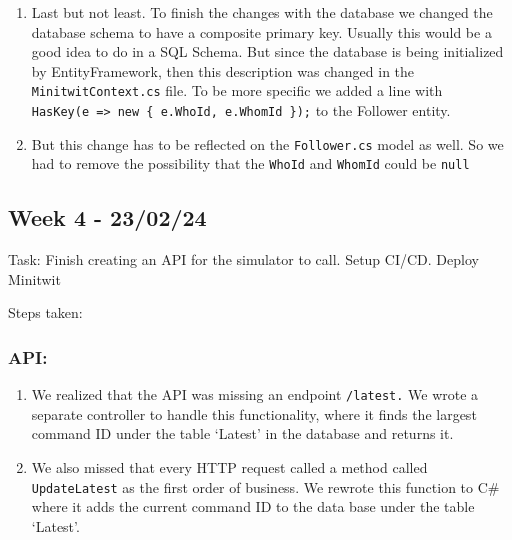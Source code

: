 \begin{enumerate}
    \item Last but not least. To finish the changes with the database we changed the database schema to have a composite primary key. Usually this would be a good idea to do in a SQL Schema. But since the database is being initialized by EntityFramework, then this description was changed in the \texttt{MinitwitContext.cs} file. To be more specific we added a line with \texttt{HasKey(e\ =\textgreater{}\ new\ \{\ e.WhoId,\ e.WhomId\ \});} to the Follower entity.
    \item But this change has to be reflected on the \texttt{Follower.cs} model as well. So we had to remove the possibility that the \texttt{WhoId} and \texttt{WhomId} could be \texttt{null}
\end{enumerate}

\subsection{Week 4 - 23/02/24}
\label{log:week4}

Task: Finish creating an API for the simulator to call. Setup CI/CD.
Deploy Minitwit

Steps taken:

\subsubsection{API:}
\label{log:api}

\begin{enumerate}
    \item We realized that the API was missing an endpoint \texttt{/latest.} We wrote a separate controller to handle this functionality, where it finds the largest command ID under the table `Latest' in the database and returns it.
    \item We also missed that every HTTP request called a method called \texttt{UpdateLatest} as the first order of business. We rewrote this function to C\# where it adds the current command ID to the data base under the table `Latest'.
\end{enumerate}

